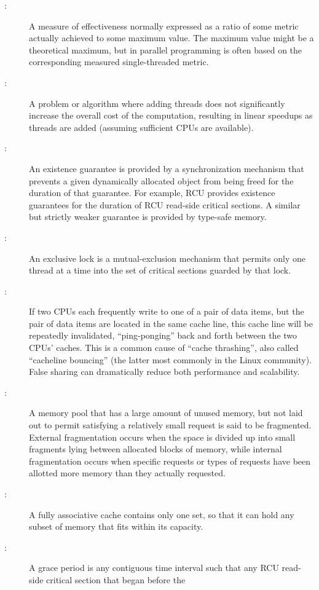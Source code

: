 \begin{description}
\item[:]
	A measure of effectiveness normally expressed as a ratio
	of some metric actually achieved to some maximum value.
	The maximum value might be a theoretical maximum, but in
	parallel programming is often based on the corresponding
	measured single-threaded metric.
\item[:]
	A problem or algorithm where adding threads does not significantly
	increase the overall cost of the computation, resulting in
	linear speedups as threads are added (assuming sufficient
	CPUs are available).
\item[:]
	An existence guarantee is provided by a synchronization mechanism
	that prevents a given dynamically allocated object from being
	freed for the duration of that guarantee.
	For example, RCU provides existence guarantees for the duration
	of RCU read-side critical sections.
	A similar but strictly weaker guarantee is provided by
	type-safe memory.
\item[:]
	An exclusive lock is a mutual-exclusion mechanism that
	permits only one thread at a time into the
	set of critical sections guarded by that lock.
\item[:]
	If two CPUs each frequently write to one of a pair of data items,
	but the pair of data items are located in the same cache line,
	this cache line will be repeatedly invalidated, ``ping-ponging''
	back and forth between the two CPUs' caches.
	This is a common cause of ``cache thrashing'', also called
	``cacheline bouncing'' (the latter most commonly in the Linux
	community).
	False sharing can dramatically reduce both performance and
	scalability.
\item[:]
	A memory pool that has a large amount of unused memory, but
	not laid out to permit satisfying a relatively small request
	is said to be fragmented.
	External fragmentation occurs when the space is divided up
	into small fragments lying between allocated blocks of memory,
	while internal fragmentation occurs when specific requests or
	types of requests have been allotted more memory than they
	actually requested.
\item[:]
	A fully associative cache contains only
	one set, so that it can hold any subset of
	memory that fits within its capacity.
\item[:]
	A grace period is any contiguous time interval such that
	any RCU read-side critical section that began before the

\end{description}
